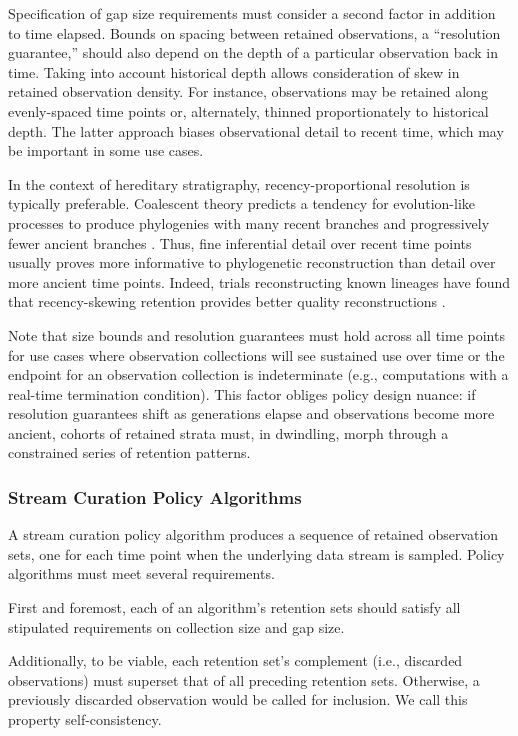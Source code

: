 Specification of gap size requirements must consider a second factor in addition to time elapsed.
Bounds on spacing between retained observations, a ``resolution guarantee,'' should also depend on the depth of a particular observation back in time.
Taking into account historical depth allows consideration of skew in retained observation density.
For instance, observations may be retained along evenly-spaced time points or, alternately, thinned proportionately to historical depth.
The latter approach biases observational detail to recent time, which may be important in some use cases.

In the context of hereditary stratigraphy, recency-proportional resolution is typically preferable.
Coalescent theory predicts a tendency for evolution-like processes to produce phylogenies with many recent branches and progressively fewer ancient branches \citep{nordborgCoalescentTheory2019, berestyckiRecentProgressCoalescent2009}.
Thus, fine inferential detail over recent time points usually proves more informative to phylogenetic reconstruction than detail over more ancient time points.
Indeed, trials reconstructing known lineages have found that recency-skewing retention provides better quality reconstructions \citep{moreno2022hereditary}.

Note that size bounds and resolution guarantees must hold across all time points for use cases where observation collections will see sustained use over time or the endpoint for an observation collection is indeterminate (e.g., computations with a real-time termination condition).
This factor obliges policy design nuance: if resolution guarantees shift as generations elapse and observations become more ancient, cohorts of retained strata must, in dwindling, morph through a constrained series of retention patterns.

\subsubsection{Stream Curation Policy Algorithms}

A stream curation policy algorithm produces a sequence of retained observation sets, one for each time point when the underlying data stream is sampled.
Policy algorithms must meet several requirements.

First and foremost, each of an algorithm's retention sets should satisfy all stipulated requirements on collection size and gap size.

Additionally, to be viable, each retention set's complement (i.e., discarded observations) must superset that of all preceding retention sets.
Otherwise, a previously discarded observation would be called for inclusion.
We call this property self-consistency.

